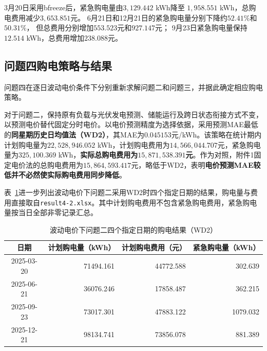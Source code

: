 \begin{table}[H]
\centering
\caption{指定日期不同滚动调整策略的计算结果}
\label{tab:p4_typical_days}
\end{table}

3月20日采用bfreeze后，紧急购电量由$3,129.442$ kWh降至
$1,958.551$ kWh，总购电费用减少$3,653.851$元。
6月21日和12月21日的紧急购电量分别下降约$52.41\%$和$50.31\%$，
但总费用分别增加$553.523$元和$927.147$元；
9月23日紧急购电量保持$12.514$ kWh，总费用增加$238.088$元。

\subsection{问题四购电策略与结果}

问题四在逐日波动电价条件下分别重新求解问题二和问题三，并据此确定相应购电策略。

对于问题二，保持原有负载与光伏发电预测、储能运行及跨日状态衔接方式不变，以预测电价替代固定分时电价。以电价预测精度为选择依据，采用预测MAE最低的\textbf{同星期历史日均值法（WD2）}，其MAE为$0.045153$元/kWh。该策略在统计期内计划购电量为$22,528,946.052$ kWh，计划购电费用为$14,566,044.707$元，紧急购电量为$325,100.369$ kWh，\textbf{实际总购电费用为$15,871,538.391$元}。作为对照，附件1固定电价法的总购电费用为$15,864,593.417$元，略低于WD2，表明\textbf{电价预测MAE较低并不必然使实际购电费用同步降低}。


表~\ref{tab:p4_2_selected_days}进一步列出波动电价下问题二采用WD2时四个指定日期的结果，购电量与费用直接取自\texttt{result4-2.xlsx}。其中计划购电费用不包含紧急购电费用，紧急购电量按当日全部非零记录汇总。

\begin{table}[H]
\centering
\caption{波动电价下问题二四个指定日期的购电结果（WD2）}
\label{tab:p4_2_selected_days}
\begin{tabular}{crrr}
\toprule
日期 & 计划购电量（kWh） & 计划购电费用（元） & 紧急购电量（kWh） \\
\midrule
2025-03-20 & 71494.161 & 44772.588 & 302.639 \\
2025-06-21 & 36076.246 & 17858.487 & 362.215 \\
2025-09-23 & 73017.301 & 47883.122 & 1079.032 \\
2025-12-21 & 98134.741 & 73856.078 & 881.389 \\
\bottomrule
\end{tabular}
\end{table}

